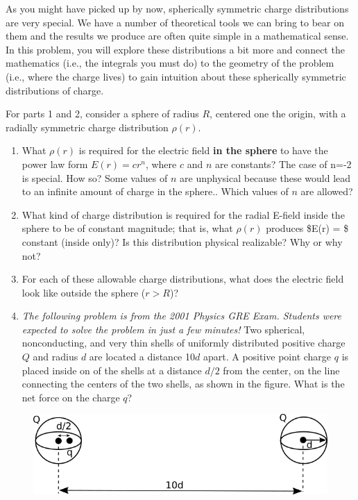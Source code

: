 \documentclass[11pt]{article}
\def\tightlist{}
\begin{document}
As you might have picked up by now, spherically symmetric charge
distributions are very special. We have a number of theoretical tools we
can bring to bear on them and the results we produce are often quite
simple in a mathematical sense. In this problem, you will explore these
distributions a bit more and connect the mathematics (i.e., the
integrals you must do) to the geometry of the problem (i.e., where the
charge lives) to gain intuition about these spherically symmetric
distributions of charge.

For parts 1 and 2, consider a sphere of radius \(R\), centered one the
origin, with a radially symmetric charge distribution \(\rho(r)\).

\begin{enumerate}
\def\labelenumi{\arabic{enumi}.}
\tightlist
\item
  What \(\rho(r)\) is required for the electric field \textbf{in the
  sphere} to have the power law form \(E(r) = cr^n\), where \(c\) and
  \(n\) are constants? The case of n=-2 is special. How so? Some values
  of \(n\) are unphysical because these would lead to an infinite amount
  of charge in the sphere.. Which values of \(n\) are allowed?
\item
  What kind of charge distribution is required for the radial E-field
  inside the sphere to be of constant magnitude; that is, what
  \(\rho(r)\) produces \$E(r) = \$ constant (inside only)? Is this
  distribution physical realizable? Why or why not?
\item
  For each of these allowable charge distributions, what does the
  electric field look like outside the sphere (\(r>R\))?
\item
  \emph{The following problem is from the 2001 Physics GRE Exam.
  Students were expected to solve the problem in just a few minutes!}
  Two spherical, nonconducting, and very thin shells of uniformly
  distributed positive charge \(Q\) and radius \(d\) are located a
  distance 10\(d\) apart. A positive point charge \(q\) is placed inside
  on of the shells at a distance \(d/2\) from the center, on the line
  connecting the centers of the two shells, as shown in the figure. What
  is the net force on the charge \(q\)?
\end{enumerate}

\begin{figure}[htbp]
\centering
\includegraphics[width=0.6\linewidth]{./images/hw3/gre_problem.png}
\end{figure}
\end{document}
